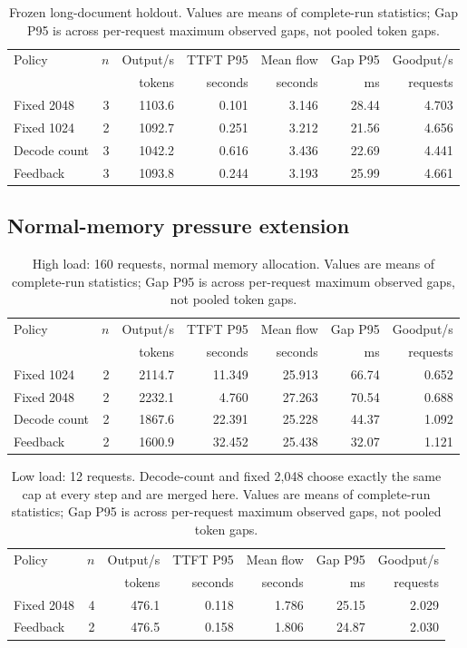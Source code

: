 \begin{table}[H]\centering\small
\begin{tabular}{lrrrrrr}
\toprule
Policy & $n$ & Output/s & TTFT P95 & Mean flow & Gap P95 & Goodput/s \\
 & & tokens & seconds & seconds & ms & requests \\ \midrule
Fixed 2048 & 3 & 1103.6 & 0.101 & 3.146 & 28.44 & 4.703 \\
Fixed 1024 & 2 & 1092.7 & 0.251 & 3.212 & 21.56 & 4.656 \\
Decode count & 3 & 1042.2 & 0.616 & 3.436 & 22.69 & 4.441 \\
Feedback & 3 & 1093.8 & 0.244 & 3.193 & 25.99 & 4.661 \\
\bottomrule\end{tabular}
\caption{Frozen long-document holdout. Values are means of complete-run statistics; Gap P95 is across per-request maximum observed gaps, not pooled token gaps.}
\end{table}

\subsection{Normal-memory pressure extension}

\begin{table}[H]\centering\small
\begin{tabular}{lrrrrrr}
\toprule
Policy & $n$ & Output/s & TTFT P95 & Mean flow & Gap P95 & Goodput/s \\
 & & tokens & seconds & seconds & ms & requests \\ \midrule
Fixed 1024 & 2 & 2114.7 & 11.349 & 25.913 & 66.74 & 0.652 \\
Fixed 2048 & 2 & 2232.1 & 4.760 & 27.263 & 70.54 & 0.688 \\
Decode count & 2 & 1867.6 & 22.391 & 25.228 & 44.37 & 1.092 \\
Feedback & 2 & 1600.9 & 32.452 & 25.438 & 32.07 & 1.121 \\
\bottomrule\end{tabular}
\caption{High load: 160 requests, normal memory allocation. Values are means of complete-run statistics; Gap P95 is across per-request maximum observed gaps, not pooled token gaps.}
\end{table}

\begin{table}[H]\centering\small
\begin{tabular}{lrrrrrr}
\toprule
Policy & $n$ & Output/s & TTFT P95 & Mean flow & Gap P95 & Goodput/s \\
 & & tokens & seconds & seconds & ms & requests \\ \midrule
Fixed 2048 & 4 & 476.1 & 0.118 & 1.786 & 25.15 & 2.029 \\
Feedback & 2 & 476.5 & 0.158 & 1.806 & 24.87 & 2.030 \\
\bottomrule\end{tabular}
\caption{Low load: 12 requests. Decode-count and fixed 2,048 choose exactly the same cap at every step and are merged here. Values are means of complete-run statistics; Gap P95 is across per-request maximum observed gaps, not pooled token gaps.}
\end{table}

